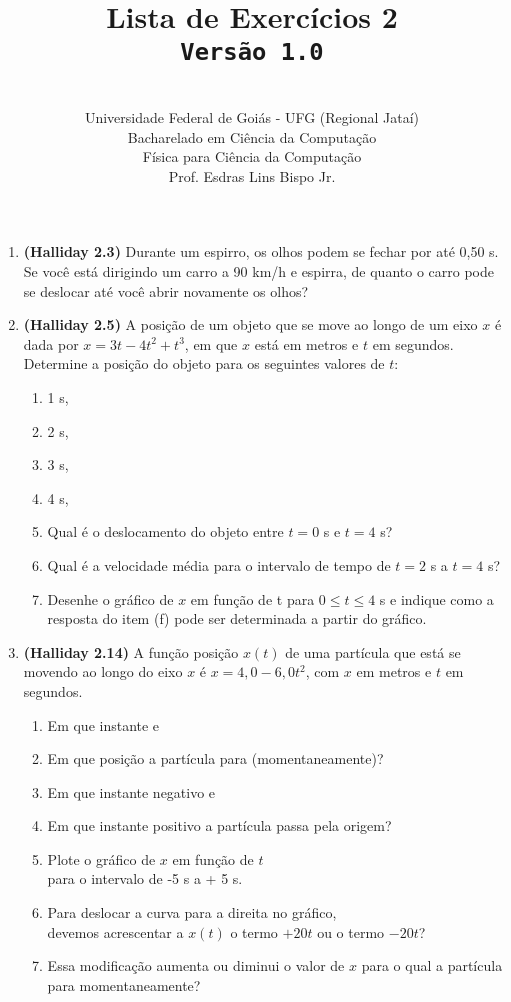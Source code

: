 \documentclass[12pt,a4paper,oneside]{article}
\author{\\Universidade Federal de Goiás - UFG (Regional Jataí) \\Bacharelado em Ciência da Computação \\Física para Ciência da Computação \\Prof. Esdras Lins Bispo Jr.}
\title{
	{\sc \huge Lista de Exercícios 2} 
	\\{\tt Versão 1.0}
}
\begin{document}
\maketitle

\begin{enumerate}

\section{Conceitos}
	
	\item {\bf (Halliday 2.3)} Durante um espirro, os olhos podem se fechar por até 0,50 s. Se você está dirigindo um carro a 90 km/h e espirra, de quanto o carro pode se deslocar até você abrir novamente os olhos?
	
	\item {\bf (Halliday 2.5)} A posição de um objeto que se move ao longo de um eixo $x$ é dada por $x = 3t - 4t^2 + t^3$, em que $x$ está em metros e $t$ em segundos. Determine a posição do objeto para os seguintes valores de $t$: 
		\begin{enumerate}
			\item 1 s,
			\item 2 s,
			\item 3 s,
			\item 4 s,
			\item Qual é o deslocamento do objeto entre $t = 0$ s e $t = 4$ s?
			\item Qual é a velocidade média para o intervalo de tempo de $t = 2$ s a $t = 4$ s?
			\item Desenhe o gráfico de $x$ em função de t para $0 \leq t \leq 4$ s e indique como a resposta do item (f) pode ser
			determinada a partir do gráfico.
		\end{enumerate}
	
	\item {\bf (Halliday 2.14)} A função posição $x(t)$ de uma partícula que está se movendo ao longo do eixo $x$ é $x = 4,0 - 6,0t^2$, com $x$ em metros e $t$ em segundos. \label{q:2-14}
	\begin{enumerate}
		\item Em que instante e
		\item Em que posição a partícula para (momentaneamente)?
		\item Em que instante negativo e
		\item Em que instante positivo a partícula passa pela origem?
		\item Plote o gráfico de $x$ em função de $t$ \\
		para o intervalo de -5 s a + 5 s.
		\item Para deslocar a curva para a direita no gráfico,\\ devemos acrescentar a $x(t)$ o termo $+20t$ ou o termo $-20t$?
		\item Essa modificação aumenta ou diminui o valor de $x$ para o qual a partícula para momentaneamente?
	\end{enumerate}


\end{enumerate}
\end{document}
